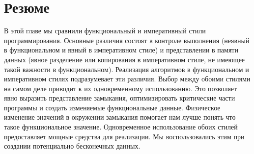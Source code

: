 \section{Резюме}
\label{sec:summary_4}

В этой главе мы сравнили функциональный и императивный стили программирования.
Основные различия состоят в контроле выполнения (неявный в функциональном и
явный в императивном стиле) и представлении в памяти данных (явное разделение
или копирования в императивном стиле, не имеющее такой важности в
функциональном). Реализация алгоритмов в функциональном и императивном стилях
подразумевает эти различия. Выбор между обоими стилями на самом деле приводит к
их одновременному использованию. Это позволяет явно выразить представление
замыкания, оптимизировать критические части программы и создать изменяемые
функциональные данные. Физическое изменение значений в окружении замыкания
помогает нам лучше понять что такое функциональное значение. Одновременное
использование обоих стилей предоставляет мощные средства для реализации. Мы
воспользовались этим при создании потенциально бесконечных данных. 